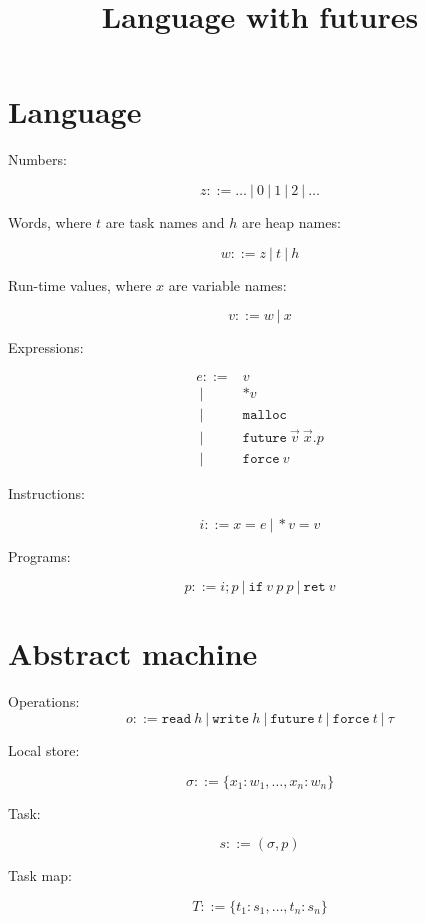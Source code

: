 \documentclass{article}
\title{Language with futures}
\date{}
\newcommand{\Prog}{p}
\newcommand{\Word}{w}
\newcommand{\Val}{v}
\newcommand{\TaskMap}{T}
\newcommand{\Task}{s}
\newcommand{\TName}{t}
\newcommand{\HName}{h}
\newcommand{\Local}{\sigma}
\newcommand{\Inst}{i}
\newcommand{\Op}{o}
\newcommand{\Var}{x}
\newcommand{\Exp}{e}
\newcommand{\Deref}[1][\Val]{*{#1}}
\newcommand{\Store}[1][\Val]{\Deref[{#1}] = }
\newcommand{\Nat}{z}
\newcommand{\Malloc}{\mathtt{malloc}}
\newcommand{\Future}[3]{\mathtt{future}\ {#1}\ {#2}.{#3}}
\newcommand{\Force}[1][\Val]{\mathtt{force}\ {#1}}
\newcommand{\If}[3][\Val]{\mathtt{if}\ {#1}\ {#2}\ {#3}}
\newcommand{\Ret}[1][\Val]{\mathtt{ret}\ {#1}}
\newcommand{\grmor}{|}
\newcommand{\Grmor}{\ \grmor\ }
\newcommand{\Grmeq}{::=}
\newcommand{\WRITE}[1]{\mathtt{write}\ {#1}}
\newcommand{\READ}[1]{\mathtt{read}\ {#1}}
\newcommand{\FUTURE}[1]{\mathtt{future}\ {#1}}
\newcommand{\FORCE}[1]{\mathtt{force}\ {#1}}
\newcommand{\TAU}{\tau}
\begin{document}
\maketitle

\section{Language}


Numbers:

$$
\Nat \Grmeq \dots \Grmor 0 \Grmor 1 \Grmor 2 \Grmor \dots
$$

Words, where $\TName$ are task names and $\HName$ are heap names:

$$
\Word \Grmeq \Nat \Grmor \TName \Grmor \HName
$$

Run-time values, where $\Var$ are variable names:

$$
\Val \Grmeq \Word \Grmor \Var
$$

Expressions:

$$
\begin{aligned}
\Exp    \Grmeq & \Val  \\
        \Grmor & \Deref \\
        \Grmor & \Malloc \\
        \Grmor & \Future {\vec \Val}  {\vec \Var} \Prog \\
        \Grmor & \Force 
\end{aligned}
$$

Instructions:

$$
\Inst \Grmeq \Var = \Exp \Grmor \Store \Val 
$$

Programs:

$$
\Prog \Grmeq \Inst; \Prog \Grmor \If \Prog \Prog \Grmor \Ret
$$

\section{Abstract machine}

Operations:
$$
\Op \Grmeq \READ \HName \Grmor \WRITE \HName \Grmor  \FUTURE \TName \Grmor \FORCE \TName \Grmor \TAU
$$

Local store:

$$
\sigma ::= \{\Var_1:\Word_1,\dots,\Var_n:\Word_n\}
$$

Task:

$$
\Task \Grmeq (\Local, \Prog)
$$

Task map:

$$
\TaskMap ::= \{\TName_1:\Task_1,\dots,\TName_n:\Task_n\}
$$
\end{document}
